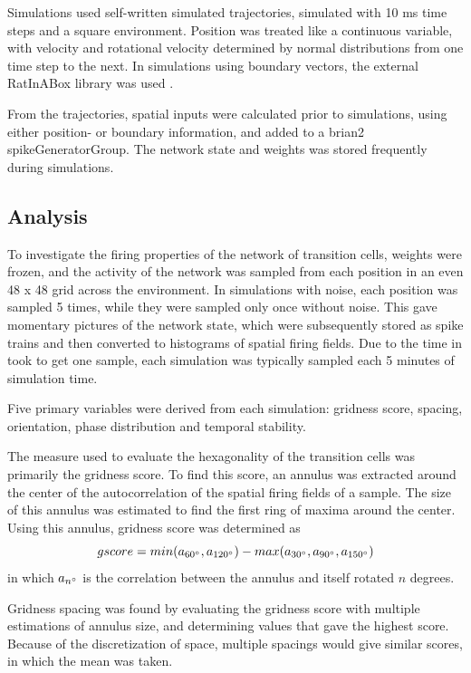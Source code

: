 \documentclass{article}
\begin{document}
    Simulations used self-written simulated trajectories, simulated with 10 ms time steps and a square environment. Position was treated like a continuous variable, with velocity and rotational velocity determined by normal distributions from one time step to the next. In simulations using boundary vectors, the external RatInABox library was used \parencite{RatInABox}. 
    
    From the trajectories, spatial inputs were calculated prior to simulations, using either position- or boundary information, and added to a brian2 spikeGeneratorGroup. The network state and weights was stored frequently during simulations.

    \subsection{Analysis}
    To investigate the firing properties of the network of transition cells, weights were frozen, and the activity of the network was sampled from each position in an even 48 x 48 grid across the environment. In simulations with noise, each position was sampled 5 times, while they were sampled only once without noise. This gave momentary pictures of the network state, which were subsequently stored as spike trains and then converted to histograms of spatial firing fields. Due to the time in took to get one sample, each simulation was typically sampled each 5 minutes of simulation time.

    Five primary variables were derived from each simulation: gridness score, spacing, orientation, phase distribution and temporal stability.
    
    The measure used to evaluate the hexagonality of the transition cells was primarily the gridness score. To find this score, an annulus was extracted around the center of the autocorrelation of the spatial firing fields of a sample. The size of this annulus was estimated to find the first ring of maxima around the center. Using this annulus, gridness score was determined as \[gscore = min(a_{60\degree}, a_{120\degree}) - max(a_{30\degree}, a_{90\degree}, a_{150\degree})\] in which \(a_{n\degree}\) is the correlation between the annulus and itself rotated \(n\) degrees.

    Gridness spacing was found by evaluating the gridness score with multiple estimations of annulus size, and determining values that gave the highest score. Because of the discretization of space, multiple spacings would give similar scores, in which the mean was taken.
\end{document}
